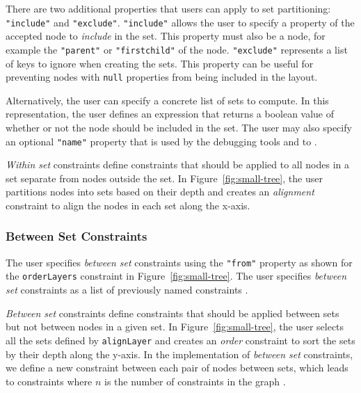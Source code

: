 There are two additional properties that users can apply to set partitioning: \texttt{"include"} and \texttt{"exclude"}. \texttt{"include"} allows the user to specify a property of the accepted node to \emph{include} in the set. This property must also be a node, for example the \texttt{"parent"} or \texttt{"firstchild"} of the node. \texttt{"exclude"} represents a list of keys to ignore when creating the sets. This property can be useful for preventing nodes with \texttt{null} properties from being included in the layout. 

Alternatively, the user can specify a concrete list of sets to compute. In this representation, the user defines an expression that returns a boolean value of whether or not the node should be included in the set. The user may also specify an optional \texttt{"name"} property that is used by the debugging tools and to . 

\emph{Within set} constraints define constraints that should be applied to all nodes in a set separate from nodes outside the set. In Figure~\ref{fig:small-tree}, the user partitions nodes into sets based on their depth and creates an \emph{alignment} constraint to align the nodes in each set along the x-axis.

\subsubsection{Between Set Constraints}
The user specifies \emph{between set} constraints using the \texttt{"from"} property as shown for the \texttt{orderLayers} constraint in Figure~\ref{fig:small-tree}. The user specifies \emph{between set} constraints as a list of previously named constraints .

\emph{Between set} constraints define constraints that should be applied between sets but not between nodes in a given set. In Figure~\ref{fig:small-tree}, the user selects all the sets defined by \texttt{alignLayer} and creates an \emph{order} constraint to sort the sets by their depth along the y-axis. In the implementation of \emph{between set} constraints, we define a new constraint between each pair of nodes between sets, which leads to  constraints where $n$ is the number of constraints in the graph .

